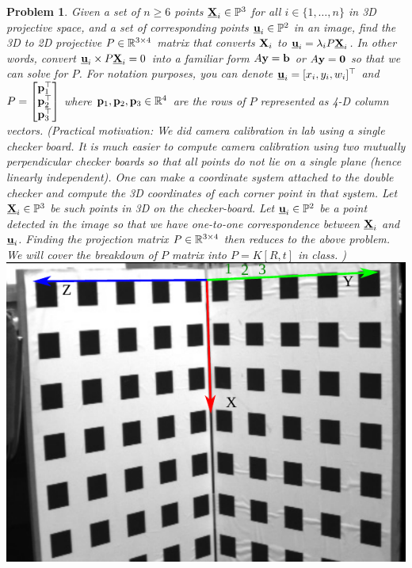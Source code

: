 \documentclass[times,singlecolumn]{article}
\newcommand{\ubfu}{\underline{\bfu}}
\newtheorem{prob}{Problem}
\begin{document}
\newcommand{\ubfX}{\underline{\bfX}}
\newpage
\begin{prob}
  Given a set of $n \ge 6$ points $\ubfX_i \in \bbP^3$ for all $i \in \{1,
  \dots, n\}$ in 3D projective space, and a set
  of corresponding points $\ubfu_i \in \bbP^2$ in an image, find the 3D to 2D projective
  $P \in \mathbb{R}^{3 \times 4}$ matrix
  that converts $\mathbf{X}_i$ to $\ubfu_i  =  \lambda_i P\ubfX_i$. In other words,
  convert $\ubfu_i \times P\ubfX_i = 0$ into a familiar form $A\mathbf{y} = \mathbf{b}$ or
  $A\mathbf{y} = \mathbf{0}$ so that we can solve for $P$. For notation purposes, you can
  denote $\ubfu_i = [x_i, y_i, w_i]^\top$ and $P = \begin{bmatrix}
    \mathbf{p}_1^\top \\ \mathbf{p}_2^\top \\ \mathbf{p}_3^\top \end{bmatrix}$ where $\mathbf{p}_1,
  \mathbf{p}_2, \mathbf{p}_3 \in \mathbb{R}^4$ are the rows of $P$ represented as 4-D column vectors.
  (Practical motivation:
    We did camera calibration in lab using a single checker board. It is much
    easier to compute camera calibration using two mutually perpendicular checker
    boards so that all points do not lie on a single plane (hence linearly
    independent). One can make a coordinate system attached to the double checker
    and compute the 3D coordinates of each corner point in that system. Let
    $\ubfX_i \in \bbP^3$ be such points in 3D on the checker-board. Let $\ubfu_i
    \in \bbP^2$ be a point detected in the image so that we have one-to-one
    correspondence between $\ubfX_i$ and $\ubfu_i$. Finding the projection matrix
    $P \in \mathbb{R}^{3 \times 4}$ then reduces to the above problem. We will cover
    the breakdown of $P$ matrix into $P = K[R, t]$ in class.
  ) \\
  \includegraphics[width=0.5\linewidth]{media/camera-calibration-rig.png.pdf}
\end{prob}
\newpage
\end{document}
